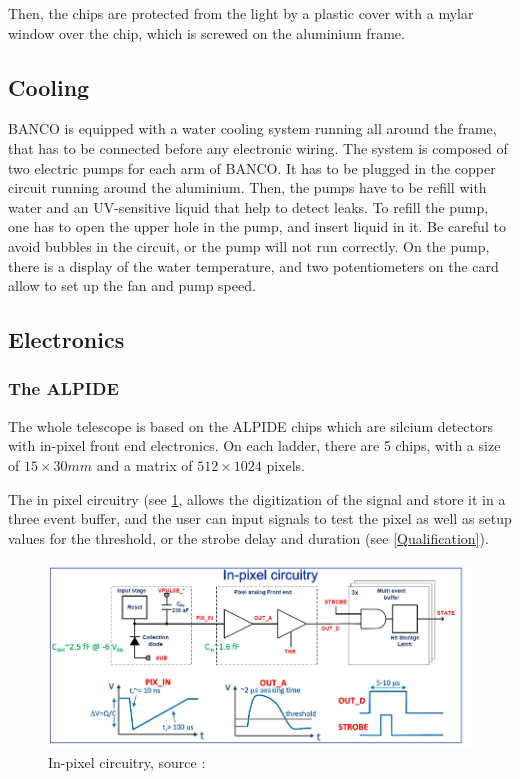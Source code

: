 \documentclass[12pt,oneside,a4]{article}
\begin{document}
    Then, the chips are protected from the light by a plastic cover with a mylar window over the chip, which is screwed on the aluminium frame. 
    
    
    \subsection{Cooling}
    BANCO is equipped with a water cooling system running all around the frame, that has to be connected before any electronic wiring. The system is composed of two electric pumps for each arm of BANCO. It has to be plugged in the copper circuit running around the aluminium. Then, the pumps have to be refill with water and an UV-sensitive liquid that help to detect leaks. 
    To refill the pump, one has to open the upper hole in the pump, and insert liquid in it. Be careful to avoid bubbles in the circuit, or the pump will not run correctly. On the pump, there is a display of the water temperature, and two potentiometers on the card allow to set up the fan and pump speed.

    
    \subsection{Electronics}
        \subsubsection{The ALPIDE}
    The whole telescope is based on the ALPIDE chips which are silcium detectors with in-pixel front end electronics. On each ladder, there are 5 chips, with a size of $15\times30mm$ and a matrix of $512\times1024$ pixels.

    The in pixel circuitry (see \ref{fig:3}, allows the digitization of the signal and store it in a three event buffer, and the user can input signals to test the pixel as well as setup values for the threshold, or the strobe delay and duration (see \ref{Qualification}). 

    \begin{figure}[h]
        \centering
        \includegraphics[scale =0.7]{figures/In-pixel circuitry.png}
        \caption{In-pixel circuitry, source : \cite{Alpide}}
        \label{fig:3}
    \end{figure}
    
\end{document}

